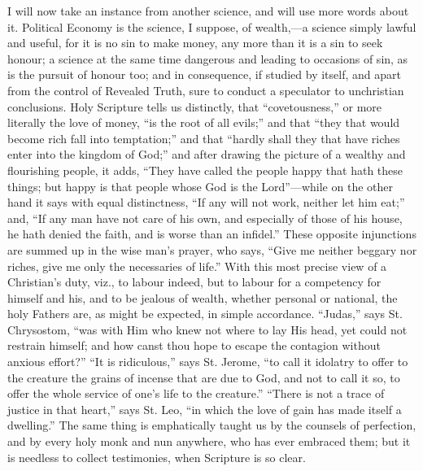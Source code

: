 I will now take an instance from another science, and will use more
words about it. Political Economy is the science, I suppose, of
wealth,—a science simply lawful and useful, for it is no sin to make
money, any more than it is a sin to seek honour; a science at the same
time dangerous and leading to occasions of sin, as is the pursuit of
honour too; and in consequence, if studied by itself, and apart from
the control of Revealed Truth, sure to conduct a speculator to
unchristian conclusions. Holy Scripture tells us distinctly, that
``covetousness,'' or more literally the love of money,
``is the root of all evils;'' and that ``they that would
become rich fall into temptation;'' and that ``hardly shall
they that have riches enter into the kingdom of God;'' and after
drawing the picture of a wealthy and flourishing people, it adds,
``They have called the people happy that hath these things; but
happy is that people whose God is the Lord''—while on the other
hand it says with equal distinctness, ``If any will not work,
neither let him eat;'' and, ``If any man have not care of his
own, and especially of those of his house, he hath denied the faith,
and is worse than an infidel.'' These opposite injunctions are
summed up in the wise man's prayer, who says, ``Give me neither
beggary nor riches, give me only the necessaries of life.'' With
this most precise view of a Christian's duty, viz., to labour indeed,
but to labour for a competency for himself and his, and to be jealous
of wealth, whether personal or national, the holy Fathers are, as
might be expected, in simple accordance. ``Judas,'' says St.
Chrysostom, ``was with Him who knew not where to lay His
head, yet could not restrain himself; and how canst thou hope to
escape the contagion without anxious effort?'' ``It is
ridiculous,'' says St. Jerome, ``to call it idolatry to offer
to the creature the grains of incense that are due to God, and not to
call it so, to offer the whole service of one's life to the
creature.'' ``There is not a trace of justice in that
heart,'' says St. Leo, ``in which the love of gain has made
itself a dwelling.'' The same thing is emphatically taught us by
the counsels of perfection, and by every holy monk and nun anywhere,
who has ever embraced them; but it is needless to collect testimonies,
when Scripture is so clear.

